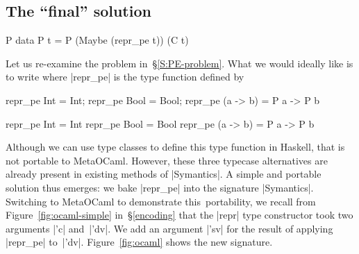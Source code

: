 \subsection{The ``final'' solution}
\label{S:PE-solution}

\begin{SaveVerbatim}{P}
data P t = P (Maybe (repr_pe t)) (C t)
\end{SaveVerbatim}

Let us re-examine the problem in~\S\ref{S:PE-problem}. What we
would ideally like is to write
\ifshort {} \else {} \fi
where |repr_pe| is the type function defined
by
\ifshort\vspace*{-0.8em}
\begin{code3}
repr_pe Int = Int; repr_pe Bool = Bool; repr_pe (a -> b) = P a -> P b
\end{code3}
\vspace*{-0.8em}
\else
\begin{code}
repr_pe Int      = Int
repr_pe Bool     = Bool
repr_pe (a -> b) = P a -> P b
\end{code}
\fi
Although we can use type classes to define this type function
in Haskell, that is not portable to MetaOCaml. However,
these three typecase alternatives are already present in existing
methods of |Symantics|.
A simple and portable solution thus emerges: we bake |repr_pe| 
into the signature |Symantics|. Switching to MetaOCaml to demonstrate
this\ifshort\else\ portability\fi,
we recall from Figure~\ref{fig:ocaml-simple} in~\S\ref{encoding} that the |repr| type
constructor took two arguments |'c| and~|'dv|. We add an argument
|'sv| for the result of applying |repr_pe| to~|'dv|.
Figure~\ref{fig:ocaml} shows the new signature.
